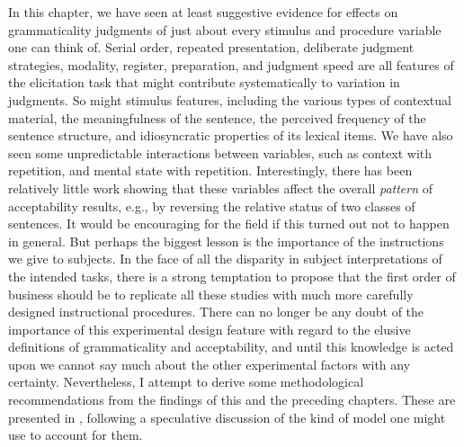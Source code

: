 In this chapter, we have seen at least suggestive evidence for effects on grammaticality judgments of just about every stimulus and procedure variable one can think of. Serial order, repeated presentation, deliberate judgment strategies, modality, register, preparation, and judgment speed are all features of the elicitation task that might contribute systematically to variation in judgments. So might stimulus features, including the various types of contextual material, the meaningfulness of the sentence, the perceived frequency of the sentence structure, and idiosyncratic properties of its lexical items. We have also seen some  unpredictable interactions between variables, such as context with repetition, and mental state with repetition. Interestingly, there has been relatively little work showing that these variables affect the overall \textit{pattern} of acceptability results, e.g., by reversing the relative status of two classes of sentences. It would be encouraging for the field if this turned out not to happen in general. But perhaps  the biggest lesson is the importance of the instructions we give to subjects. In the face of all the disparity in subject interpretations of the intended tasks, there is a strong temptation to propose that the first order of business should be to replicate all these studies with much more carefully designed instructional procedures. There can no longer be any doubt of the importance of this experimental design feature with regard to the elusive definitions of grammaticality and acceptability, and until this knowledge is acted upon we cannot say much about the other experimental factors with any certainty. Nevertheless, I attempt to derive some methodological recommendations from the findings of this and the preceding chapters. These are presented in , following a speculative discussion of the kind of model one might use to account for them.
